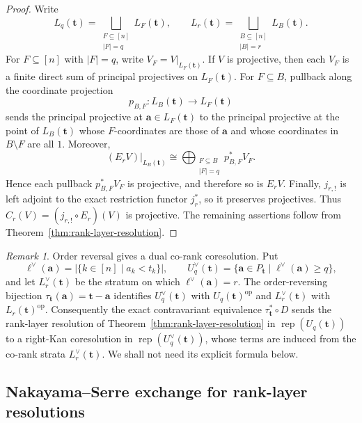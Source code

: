 \documentclass[12pt,reqno]{amsart}
\theoremstyle{definition}
\theoremstyle{remark}
\newtheorem{remark}[theorem]{Remark}
\newcommand{\Rep}{\operatorname{rep}}
\begin{document}
\begin{proof}
Write
\[
L_q(\mathbf t)=\bigsqcup_{\substack{F\subseteq[n]\\|F|=q}}L_F(\mathbf t),
\qquad
L_r(\mathbf t)=\bigsqcup_{\substack{B\subseteq[n]\\|B|=r}}L_B(\mathbf t).
\]
For $F\subseteq[n]$ with $|F|=q$, write $V_F=V|_{L_F(\mathbf t)}$.  If $V$ is projective, then
each $V_F$ is a finite direct sum of principal projectives on
$L_F(\mathbf t)$.  For $F\subseteq B$, pullback along
the coordinate projection
\[
p_{B,F}:L_B(\mathbf t)\longrightarrow L_F(\mathbf t)
\]
sends the principal projective at $\mathbf a\in L_F(\mathbf t)$ to the
principal projective at the point of $L_B(\mathbf t)$ whose $F$-coordinates
are those of $\mathbf a$ and whose coordinates in $B\setminus F$ are all
$1$.  Moreover,
\[
(E_rV)|_{L_B(\mathbf t)}
\cong
\bigoplus_{\substack{F\subseteq B\\|F|=q}}p_{B,F}^*V_F.
\]
Hence each pullback $p_{B,F}^*V_F$ is projective, and therefore so is
$E_rV$.  Finally, $j_{r,!}$ is left adjoint to the exact restriction
functor $j_r^*$, so it preserves projectives.  Thus
$C_r(V)=(j_{r,!}\circ E_r)(V)$ is projective.  The remaining assertions follow from
Theorem~\ref{thm:rank-layer-resolution}.
\end{proof}

\begin{remark}\label{rem:dual-rank-resolution}
Order reversal gives a dual co-rank coresolution.  Put
\[
\ell^\vee(\mathbf a)=|\{k\in[n]\mid a_k<t_k\}|,
\qquad
U_q^\vee(\mathbf t)=\{\mathbf a\in P_{\mathbf t}\mid
\ell^\vee(\mathbf a)\ge q\},
\]
and let $L_r^\vee(\mathbf t)$ be the stratum on which
$\ell^\vee(\mathbf a)=r$.  The order-reversing bijection
$\tau_{\mathbf t}(\mathbf a)=\mathbf t-\mathbf a$ identifies
$U_q^\vee(\mathbf t)$ with $U_q(\mathbf t)^{\mathrm{op}}$ and
$L_r^\vee(\mathbf t)$ with $L_r(\mathbf t)^{\mathrm{op}}$.  Consequently the
exact contravariant equivalence $\tau_{\mathbf t}^*\circ D$ sends the
rank-layer resolution of Theorem~\ref{thm:rank-layer-resolution} in
$\Rep(U_q(\mathbf t))$ to a right-Kan coresolution in
$\Rep(U_q^\vee(\mathbf t))$, whose terms are induced from the co-rank strata
$L_r^\vee(\mathbf t)$.  We shall not need its explicit formula below.
\end{remark}

\subsection{Nakayama--Serre exchange for rank-layer resolutions}\label{subsec:higher-nakayama}
\end{document}
